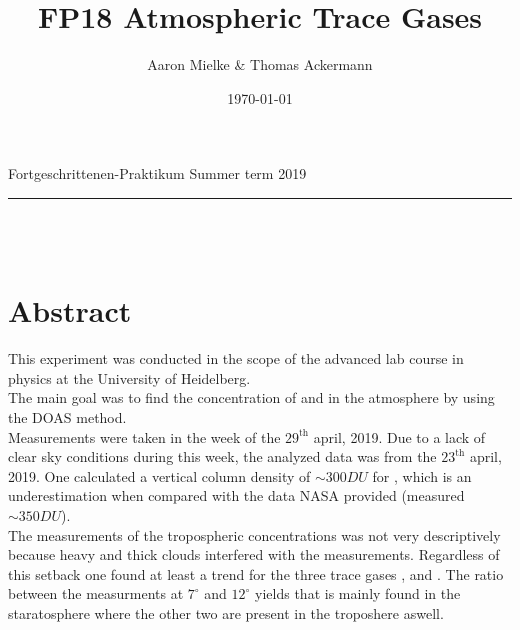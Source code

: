 \documentclass[12pt, a4paper, bibliography=totoc]{scrartcl}
\title{FP18 Atmospheric Trace Gases}
\author{Aaron Mielke \& Thomas Ackermann}
\date{\today}
\begin{document}
\begin{center}
	\makeatletter
	\thispagestyle{empty}
	\large{Fortgeschrittenen-Praktikum}	
	\hfill
    \large{Summer term 2019}
    \vspace{5mm}
	\rule{\textwidth}{0.2pt}
    \vfill
	\Huge\textbf{\@title} \\
	\vspace{10mm}
	\large{\@author} \\
	\normalfont
	\vfill	
	\makeatother
\end{center}

\normalsize

\section*{Abstract}

This experiment was conducted in the scope of the advanced lab course in physics at the University of Heidelberg. \\
The main goal was to find the concentration of  and  in the atmosphere by using the DOAS method. \\
Measurements were taken in the week of the $29^\text{th}$ april, 2019.
Due to a lack of clear sky conditions during this week, the analyzed data was from the $23^\text{th}$ april, 2019. 
One calculated a vertical column density of $\sim 300 \si{DU}$ for , which is an underestimation when compared with the data NASA provided (measured $\sim 350 \si{DU}$).\\ 
The measurements of the tropospheric concentrations was not very descriptively because heavy and thick clouds interfered with the measurements. 
Regardless of this setback one found at least a trend for the three trace gases ,  and . 
The ratio between the measurments at $7^{\circ}$ and $12^{\circ}$ yields that  is mainly found in the staratosphere where the other two are present in the troposhere aswell.

\newpage

\tableofcontents
\newpage
\end{document}
